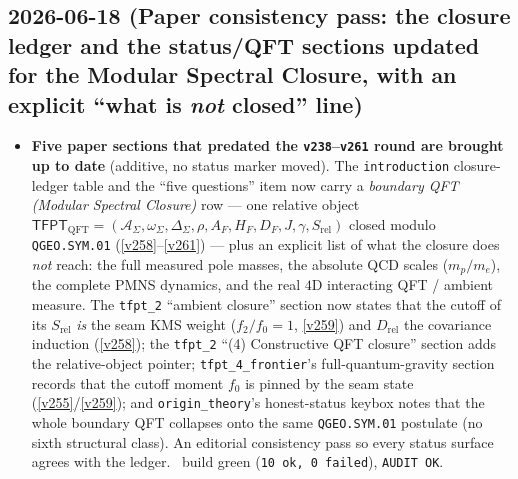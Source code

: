 \subsection*{2026-06-18 (Paper consistency pass: the closure ledger and the status/QFT sections updated for the Modular Spectral Closure, with an explicit ``what is \emph{not} closed'' line)}
\begin{itemize}
\item \textbf{Five paper sections that predated the \texttt{v238}--\texttt{v261} round are brought up to date}
  (additive, no status marker moved). The \texttt{introduction} closure-ledger table and the
  ``five questions'' item now carry a \emph{boundary QFT (Modular Spectral Closure)} row --- one relative
  object $\mathsf{TFPT}_{\mathrm{QFT}}=(\mathcal A_\Sigma,\omega_\Sigma,\Delta_\Sigma,\rho,A_F,H_F,D_F,J,
  \gamma,S_{\mathrm{rel}})$ closed modulo \texttt{QGEO.SYM.01} (\vref{v258}--\vref{v261}) --- plus an explicit
  list of what the closure does \emph{not} reach: the full measured pole masses, the absolute QCD scales
  ($m_p/m_e$), the complete PMNS dynamics, and the real $4$D interacting QFT / ambient measure. The
  \texttt{tfpt\_2} ``ambient closure'' section now states that the cutoff of its $S_{\mathrm{rel}}$ \emph{is}
  the seam KMS weight ($f_2/f_0{=}1$, \vref{v259}) and $D_{\mathrm{rel}}$ the covariance induction
  (\vref{v258}); the \texttt{tfpt\_2} ``(4) Constructive QFT closure'' section adds the relative-object
  pointer; \texttt{tfpt\_4\_frontier}'s full-quantum-gravity section records that the cutoff moment $f_0$ is
  pinned by the seam state (\vref{v255}/\vref{v259}); and \texttt{origin\_theory}'s honest-status keybox notes
  that the whole boundary QFT collapses onto the same \texttt{QGEO.SYM.01} postulate (no sixth structural
  class). An editorial consistency pass so every status surface agrees with the ledger. \mE\ build green
  (\texttt{10 ok, 0 failed}), \texttt{AUDIT OK}.
\end{itemize}


